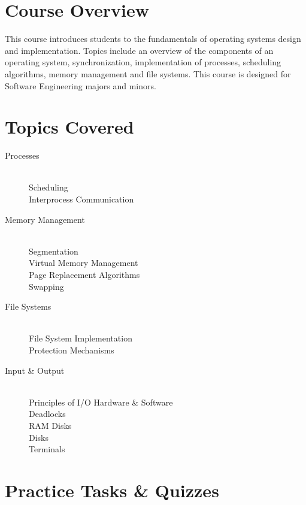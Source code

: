 \documentclass[12pt,a4paper,oneside]{article}
\begin{document}
    \section{Course Overview}

        This course introduces students to the fundamentals of operating systems
        design and implementation. Topics include an overview of the components
        of an operating system, synchronization, implementation of processes,
        scheduling algorithms, memory management and file systems. This course
        is designed for Software Engineering majors and minors.

    \section{Topics Covered}

        \begin{description}
            \item[Processes]\hfill\\
                Scheduling\\
                Interprocess Communication
            \item[Memory Management]\hfill\\
                Segmentation\\
                Virtual Memory Management\\
                Page Replacement Algorithms\\
                Swapping
            \item[File Systems]\hfill\\
                File System Implementation\\
                Protection Mechanisms
            \item[Input \& Output]\hfill\\
                Principles of I/O Hardware \& Software\\
                Deadlocks\\
                RAM Disks\\
                Disks\\
                Terminals
        \end{description}

    \section{Practice Tasks \& Quizzes}
\end{document}

